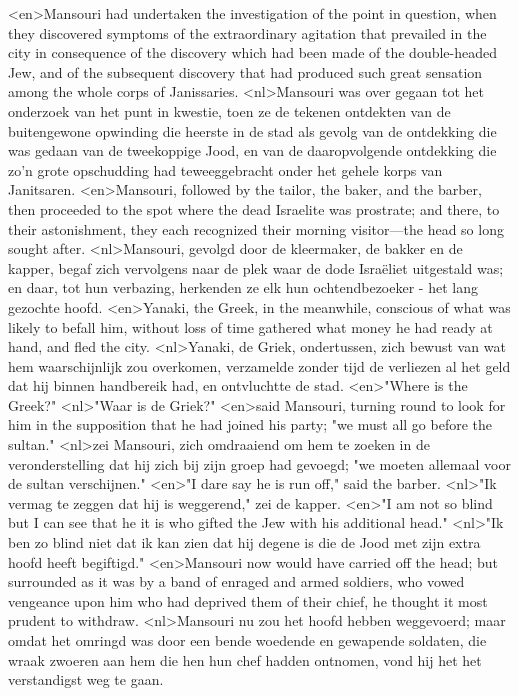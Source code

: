 <en>Mansouri had undertaken the investigation of the point in question, when they discovered symptoms of the extraordinary agitation that prevailed in the city in consequence of the discovery which had been made of the double-headed Jew, and of the subsequent discovery that had produced such great sensation among the whole corps of Janissaries.
<nl>Mansouri was over gegaan tot het onderzoek van het punt in kwestie, toen ze de tekenen ontdekten van de buitengewone opwinding die heerste in de stad als gevolg van de ontdekking die was gedaan van de tweekoppige Jood, en van de daaropvolgende ontdekking die zo'n grote opschudding had teweeggebracht onder het gehele korps van Janitsaren.
<en>Mansouri, followed by the tailor, the baker, and the barber, then proceeded to the spot where the dead Israelite was prostrate; and there, to their astonishment, they each recognized their morning visitor—the head so long sought after.
<nl>Mansouri, gevolgd door de kleermaker, de bakker en de kapper, begaf zich vervolgens naar de plek waar de dode Israëliet uitgestald was; en daar, tot hun verbazing, herkenden ze elk hun ochtendbezoeker - het lang gezochte hoofd.
<en>Yanaki, the Greek, in the meanwhile, conscious of what was likely to befall him, without loss of time gathered what money he had ready at hand, and fled the city.
<nl>Yanaki, de Griek,  ondertussen, zich bewust van wat hem waarschijnlijk zou overkomen, verzamelde zonder tijd de verliezen al het geld dat hij binnen handbereik had, en ontvluchtte de stad.
<en>"Where is the Greek?"
<nl>"Waar is de Griek?"
<en>said Mansouri, turning round to look for him in the supposition that he had joined his party; "we must all go before the sultan."
<nl>zei Mansouri, zich omdraaiend om hem te zoeken in de veronderstelling dat hij zich bij zijn groep had gevoegd; "we moeten allemaal voor de sultan verschijnen."
<en>"I dare say he is run off," said the barber.
<nl>"Ik vermag te zeggen dat hij is weggerend," zei de kapper.
<en>"I am not so blind but I can see that he it is who gifted the Jew with his additional head."
<nl>"Ik ben  zo blind niet dat ik kan zien dat hij degene is die de Jood met zijn extra hoofd heeft begiftigd."
<en>Mansouri now would have carried off the head; but surrounded as it was by a band of enraged and armed soldiers, who vowed vengeance upon him who had deprived them of their chief, he thought it most prudent to withdraw.
<nl>Mansouri nu zou het hoofd hebben weggevoerd; maar omdat het omringd was door een bende woedende en gewapende soldaten, die wraak zwoeren aan hem die hen hun chef hadden ontnomen, vond hij het het verstandigst weg te gaan.
